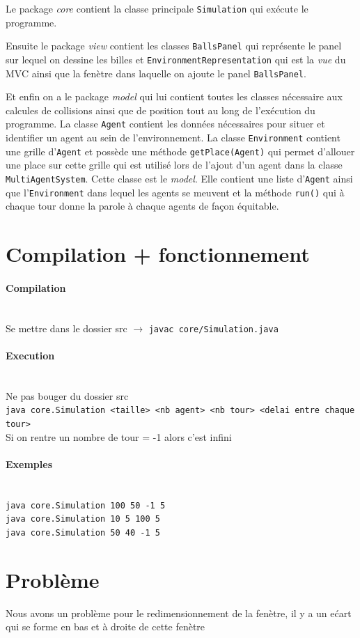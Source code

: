 \documentclass[a4paper,10pt]{article}
\begin{document}
Le package \emph{core} contient la classe principale \verb&Simulation& qui ex\'ecute le programme. 

Ensuite le package \emph{view} contient les classes \verb&BallsPanel& qui repr\'esente le panel sur lequel on dessine les billes et \verb&EnvironmentRepresentation& qui est la \emph{vue} du MVC ainsi que la fen\`etre dans laquelle on ajoute le panel \verb&BallsPanel&. 

Et enfin on a le package \emph{model} qui lui contient toutes les classes n\'ecessaire aux calcules de collisions ainsi que de position tout au long de l'ex\'ecution du programme. La classe \verb&Agent& contient les donn\'ees n\'ecessaires pour situer et identifier un agent au sein de l'environnement. La classe \verb&Environment& contient une grille d'\verb&Agent& et poss\`ede une m\'ethode \verb&getPlace(Agent)& qui permet d'allouer une place sur cette grille qui est utilis\'e lors de l'ajout d'un agent dans la classe \verb&MultiAgentSystem&. Cette classe est le \emph{model}. Elle contient une liste d'\verb&Agent& ainsi que l'\verb&Environment& dans lequel les agents se meuvent et la m\'ethode \verb&run()& qui \`a chaque tour donne la parole \`a chaque agents de fa\c{c}on \'equitable.
 
\section{Compilation + fonctionnement}
 
\paragraph{Compilation} ~\\
Se mettre dans le dossier src $\rightarrow$ \verb&javac core/Simulation.java&

\paragraph{Execution} ~\\
Ne pas bouger du dossier src \\
\verb&java core.Simulation <taille> <nb agent> <nb tour> <delai entre chaque tour>& \\
Si on rentre un nombre de tour = -1 alors c'est infini

\paragraph{Exemples} ~\\
\verb&java core.Simulation 100 50 -1 5& \\
\verb&java core.Simulation 10 5 100 5& \\
\verb&java core.Simulation 50 40 -1 5& \\

\section{Probl\`eme}

Nous avons un probl\`eme pour le redimensionnement de la fen\`etre, il y a un e\'cart qui se forme en bas et \`a droite de cette fen\`etre
\end{document}
